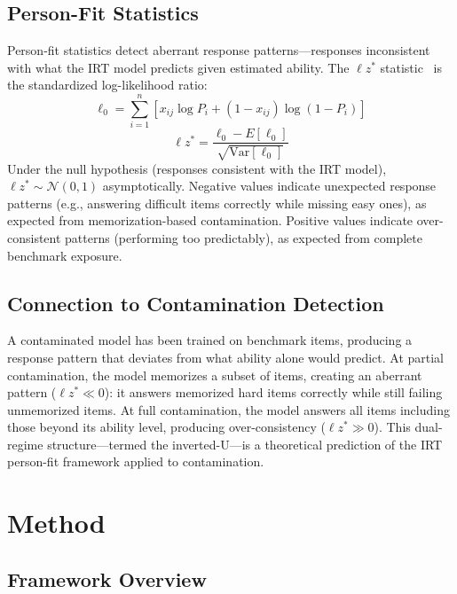 \documentclass[11pt,a4paper]{article}
\newcommand{\lzstar}{\ensuremath{\ell z^*}}
\begin{document}
\subsection{Person-Fit Statistics}

Person-fit statistics detect aberrant response patterns---responses inconsistent with what the IRT model predicts given estimated ability.
The $\lzstar$ statistic~\citep{snijders2001} is the standardized log-likelihood ratio:
\begin{equation}
\ell_0 = \sum_{i=1}^{n} \left[ x_{ij} \log P_i + (1-x_{ij}) \log(1-P_i) \right]
\end{equation}
\begin{equation}
\lzstar = \frac{\ell_0 - E[\ell_0]}{\sqrt{\text{Var}[\ell_0]}}
\end{equation}
Under the null hypothesis (responses consistent with the IRT model), $\lzstar \sim \mathcal{N}(0,1)$ asymptotically.
Negative values indicate unexpected response patterns (e.g., answering difficult items correctly while missing easy ones), as expected from memorization-based contamination.
Positive values indicate over-consistent patterns (performing too predictably), as expected from complete benchmark exposure.

\subsection{Connection to Contamination Detection}

A contaminated model has been trained on benchmark items, producing a response pattern that deviates from what ability alone would predict.
At partial contamination, the model memorizes a subset of items, creating an aberrant pattern ($\lzstar \ll 0$): it answers memorized hard items correctly while still failing unmemorized items.
At full contamination, the model answers all items including those beyond its ability level, producing over-consistency ($\lzstar \gg 0$).
This dual-regime structure---termed the inverted-U---is a theoretical prediction of the IRT person-fit framework applied to contamination.

\section{Method}

\subsection{Framework Overview}
\end{document}
